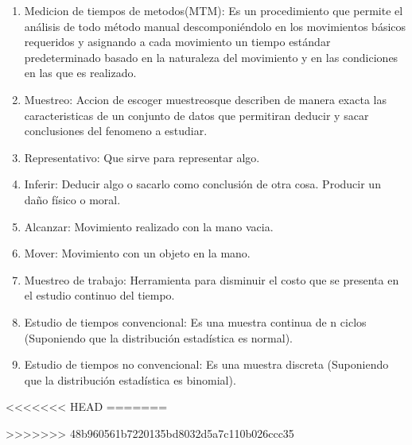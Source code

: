 \begin{enumerate}
    \cite{DiapositivasSema-2-21}
    \item Medicion de tiempos de metodos(MTM): Es un procedimiento que permite el análisis de todo método manual descomponiéndolo en los movimientos básicos requeridos y asignando a cada movimiento un tiempo estándar predeterminado basado en la naturaleza del movimiento y en las condiciones en las que es realizado.
    \item Muestreo: Accion de escoger muestreosque describen de manera exacta las caracteristicas de un conjunto de datos que permitiran deducir y sacar conclusiones del fenomeno a estudiar.
    \cite{DiapositivasSema-4-04}
    \item Representativo: Que sirve para representar algo.
    \cite{DiapositivasSema-4-04}
    \item Inferir:  Deducir algo o sacarlo como conclusión de otra cosa. Producir un daño físico o moral.
    \cite{asalerae2023}
    \item Alcanzar: Movimiento realizado con la mano vacia.
    \cite{asale_rae_2023}
    \item Mover: Movimiento con un objeto en la mano.
    \cite{DiapositivasSema-2-22}
    \item Muestreo de trabajo: Herramienta para disminuir el costo que se presenta en el estudio continuo del tiempo.
    \cite{DiapositivasSema-4-04}
    \item Estudio de tiempos convencional: Es una muestra continua de n ciclos (Suponiendo que la distribución estadística es normal).
    \cite{DiapositivasSema-4-04}
    \item Estudio de tiempos no convencional: Es una muestra discreta (Suponiendo que la distribución estadística es binomial).
    \cite{DiapositivasSema-4-04}
\end{enumerate}


<<<<<<< HEAD
=======

>>>>>>> 48b960561b7220135bd8032d5a7c110b026ccc35
